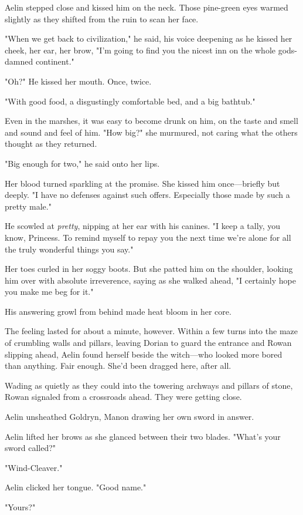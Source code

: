 Aelin stepped close and kissed him on the neck. Those pine-green eyes warmed slightly as they shifted from the ruin to scan her face.

"When we get back to civilization," he said, his voice deepening as he kissed her cheek, her ear, her brow, "I'm going to find you the nicest inn on the whole gods-damned continent."

"Oh?" He kissed her mouth. Once, twice.

"With good food, a disgustingly comfortable bed, and a big bathtub."

Even in the marshes, it was easy to become drunk on him, on the taste and smell and sound and feel of him. "How big?" she murmured, not caring what the others thought as they returned.

"Big enough for two," he said onto her lips.

Her blood turned sparkling at the promise. She kissed him once---briefly but deeply. "I have no defenses against such offers. Especially those made by such a pretty male."

He scowled at \emph{pretty}, nipping at her ear with his canines. "I keep a tally, you know, Princess. To remind myself to repay you the next time we're alone for all the truly wonderful things you say."

Her toes curled in her soggy boots. But she patted him on the shoulder, looking him over with absolute irreverence, saying as she walked ahead, "I certainly hope you make me beg for it."

His answering growl from behind made heat bloom in her core.

The feeling lasted for about a minute, however. Within a few turns into the maze of crumbling walls and pillars, leaving Dorian to guard the entrance and Rowan slipping ahead, Aelin found herself beside the witch---who looked more bored than anything. Fair enough. She'd been dragged here, after all.

Wading as quietly as they could into the towering archways and pillars of stone, Rowan signaled from a crossroads ahead. They were getting close.

Aelin unsheathed Goldryn, Manon drawing her own sword in answer.

Aelin lifted her brows as she glanced between their two blades. "What's your sword called?"

"Wind-Cleaver."

Aelin clicked her tongue. "Good name."

"Yours?"

